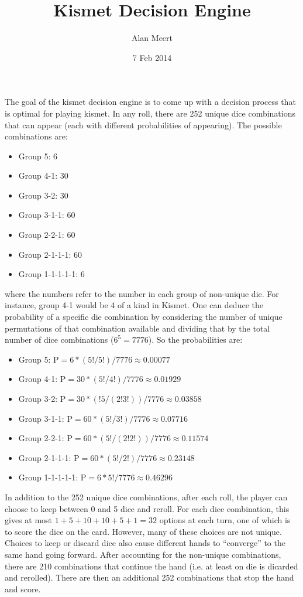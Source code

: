 \documentclass[10pt, onecolumn]{article}
\title{Kismet Decision Engine}
\author{Alan Meert}
\date{7 Feb 2014}
\begin{document}
\maketitle

The goal of the kismet decision engine is to come up with a decision process that is optimal for playing kismet. 
In any roll, there are 252 unique dice combinations that can appear (each with different probabilities of appearing).
The possible combinations are:
\begin{itemize} 
\item Group 5: 6 
\item Group 4-1: 30 
\item Group 3-2: 30 
\item Group 3-1-1: 60 
\item Group 2-2-1: 60 
\item Group 2-1-1-1: 60 
\item Group 1-1-1-1-1: 6 
\end{itemize}
where the numbers refer to the number in each group of non-unique die. For instance, group 4-1 would be 4 of a kind in Kismet. 
One can deduce the probability of a specific die combination by considering the number of unique permutations of that 
combination available and dividing that by the total number of dice combinations ($6^5=7776$). So the probabilities are:
\begin{itemize} 
\item Group 5: P$=6*(5!/5!)/7776 \approx  0.00077$
\item Group 4-1: P$=30*(5!/4!)/7776 \approx  0.01929$ 
\item Group 3-2: P$=30*(!5/(2!3!))/7776 \approx  0.03858$ 
\item Group 3-1-1: P$=60*(5!/3!)/7776 \approx 0.07716$ 
\item Group 2-2-1: P$=60*(5!/(2!2!))/7776 \approx  0.11574$ 
\item Group 2-1-1-1: P$=60*(5!/2!)/7776 \approx  0.23148$ 
\item Group 1-1-1-1-1: P$=6*5!/7776 \approx  0.46296$ 
\end{itemize}
 
In addition to the 252 unique dice combinations, after each roll, the player can choose to keep between 0 and 5 dice and reroll. 
For each dice combination, this gives at most $1+5+10+10+5+1=32$ options at each turn, one of which is to score the dice on the card.
However, many of these choices are not unique. Choices to keep or discard dice also cause different hands to ``converge'' to the same
hand going forward. After accounting for the non-unique combinations, there are 210 combinations that continue the hand 
(i.e. at least on die is dicarded and rerolled). There are then an additional 252 combinations that stop the hand and score. 
\end{document}
